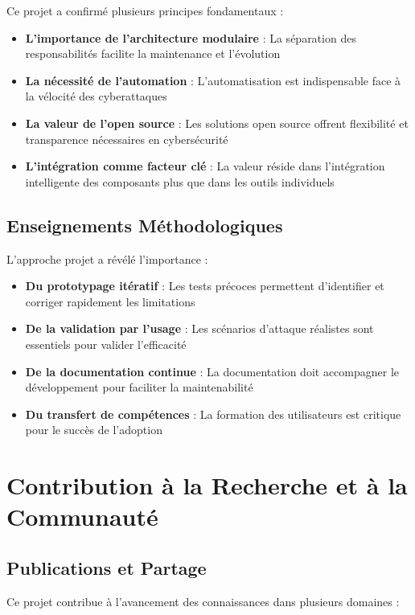 Ce projet a confirmé plusieurs principes fondamentaux :

\begin{itemize}
  \item \textbf{L'importance de l'architecture modulaire} : La séparation des responsabilités facilite la maintenance et l'évolution
  \item \textbf{La nécessité de l'automation} : L'automatisation est indispensable face à la vélocité des cyberattaques
  \item \textbf{La valeur de l'open source} : Les solutions open source offrent flexibilité et transparence nécessaires en cybersécurité
  \item \textbf{L'intégration comme facteur clé} : La valeur réside dans l'intégration intelligente des composants plus que dans les outils individuels
\end{itemize}

\subsection{Enseignements Méthodologiques}

L'approche projet a révélé l'importance :

\begin{itemize}
  \item \textbf{Du prototypage itératif} : Les tests précoces permettent d'identifier et corriger rapidement les limitations
  \item \textbf{De la validation par l'usage} : Les scénarios d'attaque réalistes sont essentiels pour valider l'efficacité
  \item \textbf{De la documentation continue} : La documentation doit accompagner le développement pour faciliter la maintenabilité
  \item \textbf{Du transfert de compétences} : La formation des utilisateurs est critique pour le succès de l'adoption
\end{itemize}

\section{Contribution à la Recherche et à la Communauté}

\subsection{Publications et Partage}

Ce projet contribue à l'avancement des connaissances dans plusieurs domaines :

